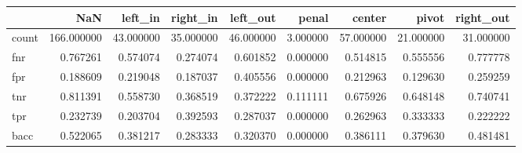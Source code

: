 \begin{tabular}{lrrrrrrrr}
\toprule
{} &         NaN &    left\_in &   right\_in &   left\_out &     penal &     center &      pivot &  right\_out \\
\midrule
count &  166.000000 &  43.000000 &  35.000000 &  46.000000 &  3.000000 &  57.000000 &  21.000000 &  31.000000 \\
fnr   &    0.767261 &   0.574074 &   0.274074 &   0.601852 &  0.000000 &   0.514815 &   0.555556 &   0.777778 \\
fpr   &    0.188609 &   0.219048 &   0.187037 &   0.405556 &  0.000000 &   0.212963 &   0.129630 &   0.259259 \\
tnr   &    0.811391 &   0.558730 &   0.368519 &   0.372222 &  0.111111 &   0.675926 &   0.648148 &   0.740741 \\
tpr   &    0.232739 &   0.203704 &   0.392593 &   0.287037 &  0.000000 &   0.262963 &   0.333333 &   0.222222 \\
bacc  &    0.522065 &   0.381217 &   0.283333 &   0.320370 &  0.000000 &   0.386111 &   0.379630 &   0.481481 \\
\bottomrule
\end{tabular}

